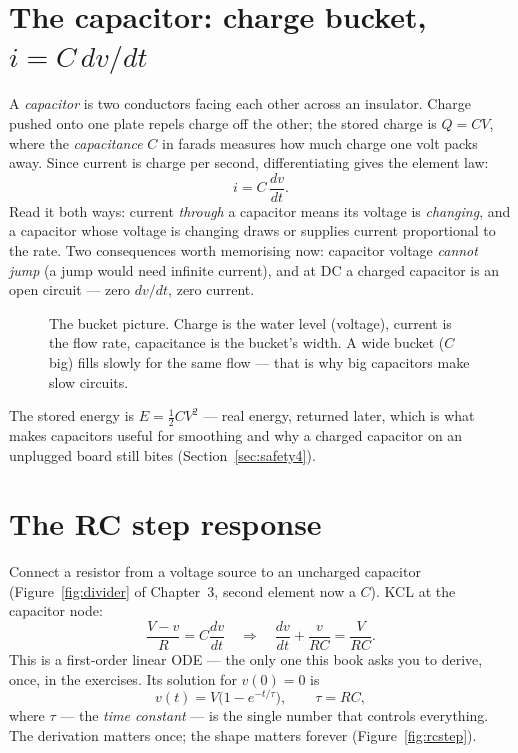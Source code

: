 \section{The capacitor: charge bucket, $i = C\,dv/dt$}
\label{sec:cap}

A \emph{capacitor} is two conductors facing each other
across an insulator. Charge pushed onto one plate repels charge off the
other; the stored charge is $Q = CV$, where the \emph{capacitance}
 $C$ in farads measures how much charge one volt packs
away. Since current is charge per second, differentiating gives the element
law:
\[
i = C\,\frac{dv}{dt}.
\]
Read it both ways: current \emph{through} a capacitor means its voltage is
\emph{changing}, and a capacitor whose voltage is changing draws or supplies
current proportional to the rate. Two consequences worth memorising now:
capacitor voltage \emph{cannot jump} (a jump would need infinite current),
and at DC a charged capacitor is an open circuit — zero $dv/dt$, zero current.

\begin{figure}[htbp]
\centering

\caption{The bucket picture. Charge is the water level (voltage), current is
the flow rate, capacitance is the bucket's width. A wide bucket ($C$ big)
fills slowly for the same flow — that is why big capacitors make slow
circuits.}
\label{fig:charge04}
\end{figure}

The stored energy is $E=\tfrac12 CV^2$ — real energy, returned later, which
is what makes capacitors useful for smoothing and why a charged capacitor on
an unplugged board still bites (Section~\ref{sec:safety4}).

\section{The RC step response}
\label{sec:rcstep}

Connect a resistor from a voltage source to an uncharged capacitor
(Figure~\ref{fig:divider} of Chapter~3, second element now a $C$). KCL at the
capacitor node:
\[
\frac{V-v}{R} = C\frac{dv}{dt}
\quad\Longrightarrow\quad
\frac{dv}{dt}+\frac{v}{RC}=\frac{V}{RC}.
\]
This is a first-order linear ODE — the only one this book asks you to derive,
once, in the exercises. Its solution for $v(0)=0$ is
\[
v(t) = V\bigl(1-e^{-t/\tau}\bigr),\qquad \tau = RC,
\]
where $\tau$ — the \emph{time constant} — is the single
number that controls everything. The derivation matters once; the shape
matters forever (Figure~\ref{fig:rcstep}).

